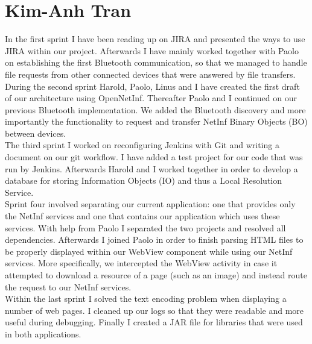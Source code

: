 \section{Kim-Anh Tran}

In the first sprint I have been reading up on JIRA and presented the ways to use
JIRA within our project. Afterwards I have mainly worked together with Paolo on establishing
the first Bluetooth communication, so that we managed to handle file requests from other connected
devices that were answered by file transfers.\\

During the second sprint Harold, Paolo, Linus and I have created the first draft of our architecture using OpenNetInf. Thereafter Paolo and I continued on our previous Bluetooth implementation. We added
the Bluetooth discovery and more importantly the functionality to request and
transfer NetInf Binary Objects (BO) between devices.\\

The third sprint I worked on reconfiguring Jenkins with Git and writing a document on
our git workflow. I have added a test project for our code that was run by Jenkins.
Afterwards Harold and I worked together in order to develop a database for storing
Information Objects (IO) and thus a Local Resolution Service.\\

Sprint four involved separating our current application: one that provides
only the NetInf services and one that contains our application which uses
these services. With help from Paolo I separated the two projects and resolved
all dependencies. Afterwards I joined Paolo in order to finish parsing HTML files
to be properly displayed within our WebView component while using our NetInf services.
More specifically, we intercepted the WebView activity in case it attempted to
download a resource of a page (such as an image) and instead route the 
request to our NetInf services.\\

Within the last sprint I solved the text encoding problem when displaying 
a number of web pages. I cleaned up our logs so that they were readable and
more useful during debugging. Finally I created a JAR file for
libraries that were used in both applications.\\

